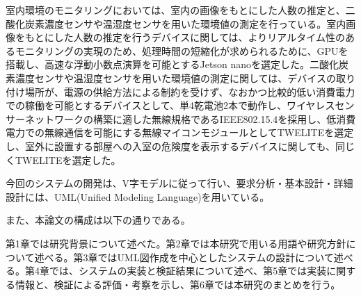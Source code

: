 室内環境のモニタリングにおいては、室内の画像をもとにした人数の推定と、二酸化炭素濃度センサや温湿度センサを用いた環境値の測定を行っている。室内画像をもとにした人数の推定を行うデバイスに関しては、よりリアルタイム性のあるモニタリングの実現のため、処理時間の短縮化が求められるために、GPUを搭載し、高速な浮動小数点演算を可能とするJetson nanoを選定した。二酸化炭素濃度センサや温湿度センサを用いた環境値の測定に関しては、デバイスの取り付け場所が、電源の供給方法による制約を受けず、なおかつ比較的低い消費電力での稼働を可能とするデバイスとして、単4乾電池2本で動作し、ワイヤレスセンサーネットワークの構築に適した無線規格であるIEEE802.15.4を採用し、低消費電力での無線通信を可能にする無線マイコンモジュールとしてTWELITEを選定し、室外に設置する部屋への入室の危険度を表示するデバイスに関しても、同じくTWELITEを選定した。

今回のシステムの開発は、V字モデルに従って行い、要求分析・基本設計・詳細設計には、UML(Unified Modeling Language)を用いている。

また、本論文の構成は以下の通りである。

第1章では研究背景について述べた。第2章では本研究で用いる用語や研究方針について述べる。第3章ではUML図作成を中心としたシステムの設計について述べる。第4章では、システムの実装と検証結果について述べ、第5章では実装に関する情報と、検証による評価・考察を示し、第6章では本研究のまとめを行う。　　


　
